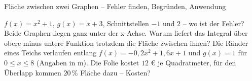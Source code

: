 \begin{aufgabe}{Fläche zwischen zwei Graphen – Fehler finden, Begründen, Anwendung}
\begin{teile}
\teil $f(x) = x^2 + 1$, $g(x) = x + 3$, Schnittstellen $-1$ und $2$ – wo ist der Fehler? 
\teil Beide Graphen liegen ganz unter der x-Achse. Warum liefert das Integral über obere minus untere Funktion trotzdem die Fläche zwischen ihnen?
\teil Die Ränder eines Teichs verlaufen entlang $f(x) = -0{,}2x^2 + 1{,}6x + 1$ und $g(x) = 1$ für $0 \le x \le 8$ (Angaben in m). Die Folie kostet $12$ € je Quadratmeter, für den Überlapp kommen $20\,\%$ Fläche dazu – Kosten?
\end{teile}
\end{aufgabe}
